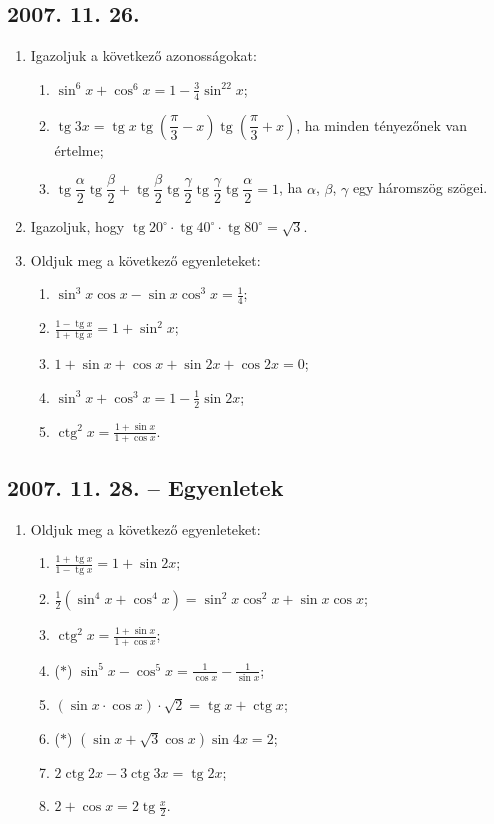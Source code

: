 \documentclass{article}
\newenvironment{abc}{\begin{enumerate}[label=\textit{\alph*})]}{\end{enumerate}}
\newcommand{\tg}{\mathop{\mathrm{tg}}\nolimits}
\newcommand{\ctg}{\mathop{\mathrm{ctg}}\nolimits}
\begin{document}
\subsection*{2007. 11. 26.}
\begin{enumerate}
\item Igazoljuk a következő azonosságokat:
\begin{abc}
\item $\sin^6x+\cos^6x=1-\displaystyle{\frac{3}{4}}\sin^22x$;
\item $\tg3x=\tg x\tg\left(\dfrac{\pi}{3}-x\right)\tg\left(\dfrac{\pi}{3}+x\right)$, ha minden tényezőnek van értelme;
\item $\tg\dfrac{\alpha}{2}\tg\dfrac{\beta}{2}+\tg\dfrac{\beta}{2}\tg\dfrac{\gamma}{2}\tg\dfrac{\gamma}{2}\tg\dfrac{\alpha}{2}=1$, ha $\alpha$, $\beta$, $\gamma$ egy háromszög szögei.
\end{abc}
\item Igazoljuk, hogy $\tg20^{\circ}\cdot\tg40^{\circ}\cdot\tg80^{\circ}=\sqrt3$.
\item Oldjuk meg a következő egyenleteket:
\begin{abc}
\item $\sin^3x\cos x-\sin x\cos^3x=\displaystyle{\frac{1}{4}}$;
\item $\displaystyle{\frac{1-\tg x}{1+\tg x}}=1+\sin^2x$;
\item $1+\sin x+\cos x+\sin2x+\cos2x=0$;
\item $\sin^3x+\cos^3x=1-\displaystyle{\frac{1}{2}}\sin 2x$;
\item $\ctg^2x=\displaystyle{\frac{1+\sin x}{1+\cos x}}$.
\end{abc}
\end{enumerate}

\subsection*{2007. 11. 28. -- Egyenletek}
\begin{enumerate}
\item Oldjuk meg a következő egyenleteket:
\begin{abc}
\item $\displaystyle{\frac{1+\tg x}{1-\tg x}}=1+\sin 2x$;
\item $\displaystyle{\frac{1}{2}}\left(\sin^4x+\cos^4x\right)=\sin^2x\cos^2x+\sin x\cos x$;
\item $\ctg^2x=\displaystyle{\frac{1+\sin x}{1+\cos x}}$;
\item ($*$) $\displaystyle{\sin^5x-\cos^5x=\frac{1}{\cos x}-\frac{1}{\sin x}}$;
\item $(\sin x\cdot\cos x)\cdot\sqrt2=\tg x + \ctg x$;
\item ($*$) $\left(\sin x+\sqrt3\cos x\right)\sin 4x = 2$;
\item $2\ctg2x-3\ctg3x=\tg2x$;
\item $2+\cos x=2\tg\displaystyle{\frac{x}{2}}$.
\end{abc}
\end{enumerate}
\end{document}
